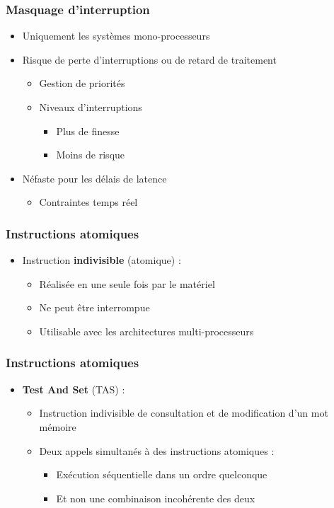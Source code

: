 \begin{frame}
\frametitle{Masquage d’interruption}
\begin{itemize}
\item Uniquement les systèmes mono-processeurs
\item Risque de perte d'interruptions ou de retard de traitement
\begin{itemize}
\item Gestion de priorités
\item Niveaux d'interruptions
\begin{itemize}
\item Plus de finesse
\item Moins de risque
\end{itemize}
\end{itemize}
\item Néfaste pour les délais de latence
\begin{itemize}
\item Contraintes temps réel
\end{itemize}
\end{itemize}
\end{frame}

\begin{frame}
\frametitle{Instructions atomiques}
\begin{itemize}
\item Instruction \textbf{indivisible} (atomique) :
\begin{itemize}
\item Réalisée en une seule fois par le matériel
\item Ne peut être interrompue
\item Utilisable avec les architectures multi-processeurs
\end{itemize}
\end{itemize}
\end{frame}

\begin{frame}
\frametitle{Instructions atomiques}
\begin{itemize}
\item \textbf{Test And Set} (TAS) :
\begin{itemize}
\item Instruction indivisible de consultation et de modification d'un mot mémoire
\item Deux appels simultanés à des instructions atomiques :
\begin{itemize}
\item Exécution séquentielle dans un ordre quelconque
\item Et non une combinaison incohérente des deux
\end{itemize}
\end{itemize}
\end{itemize}
\end{frame}

